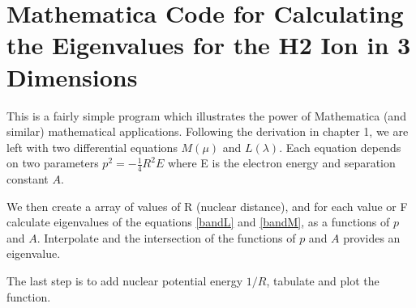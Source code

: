 \chapter{Mathematica Code for Calculating the Eigenvalues for the H2 Ion in 3 Dimensions}
\label{AppendixB}

This is a fairly simple program which illustrates the power of Mathematica (and similar) mathematical applications. Following the derivation in chapter 1, we are left with two differential equations $ M(\mu) $ and $ L(\lambda) $. Each equation depends on  two parameters $ p^2 = -\frac{1}{4}R^2E $ where E is the electron energy and separation constant $ A $.

We then create a array of values of R (nuclear distance), and for each value or F calculate eigenvalues of the equations \eqref{bandL} and  \eqref{bandM}, as a functions of $ p $ and $ A $. Interpolate and the intersection of the functions of $ p $ and $ A $ provides an eigenvalue.

The last step is to add nuclear potential energy $ 1/R $, tabulate and plot the function.


